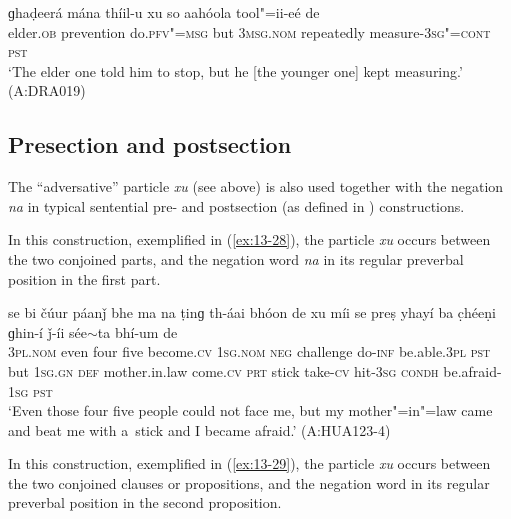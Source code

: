 \begin{exe}
\ex
\label{ex:13-27}
\gll ɡhaḍeerá mána thíil-u xu so aahóola tool"=ii-eé de \\
elder.\textsc{ob} prevention do.\textsc{pfv"=msg} but \textsc{3msg.nom} repeatedly measure-\textsc{3sg"=cont}{\protect\footnotemark} \textsc{pst} \\
\glt `The elder one told him to stop, but he [the younger one] kept measuring.' (A:DRA019)
\end{exe}


\subsection{Presection and postsection}
\label{subsec:13-2-2}

The ``adversative'' particle \textit{xu} (see above) is also used together with the negation \textit{na} in typical sentential pre- and postsection (as defined in ) constructions.


 In this construction, exemplified in (\ref{ex:13-28}), the particle \textit{xu} occurs between the two conjoined parts, and the negation word \textit{na} in its regular preverbal position in the first part.

\begin{exe}
\ex
\label{ex:13-28}
\gll se bi čúur páanǰ bhe ma na ṭinɡ th-áai bhóon de xu míi se preṣ yhayí ba c̣héeṇi ɡhin-í ǰ-íi sée$\sim$ta bhí-um de \\
\textsc{3pl.nom} even four five become.\textsc{cv} \textsc{1sg.nom} \textsc{neg}  challenge do-\textsc{inf} be.able.\textsc{3pl} \textsc{pst} but \textsc{1sg.gn}  \textsc{def} mother.in.law come.\textsc{cv} \textsc{prt} stick take-\textsc{cv} hit-\textsc{3sg} \textsc{condh} be.afraid-\textsc{1sg} \textsc{pst} \\
\glt `Even those four five people could not face me, but my mother"=in"=law came and beat me with a~stick and I became afraid.' (A:HUA123-4) 
\end{exe}

 In this construction, exemplified in (\ref{ex:13-29}), the particle \textit{xu} occurs between the two conjoined clauses or propositions, and the negation word in its regular preverbal position in the second proposition.

